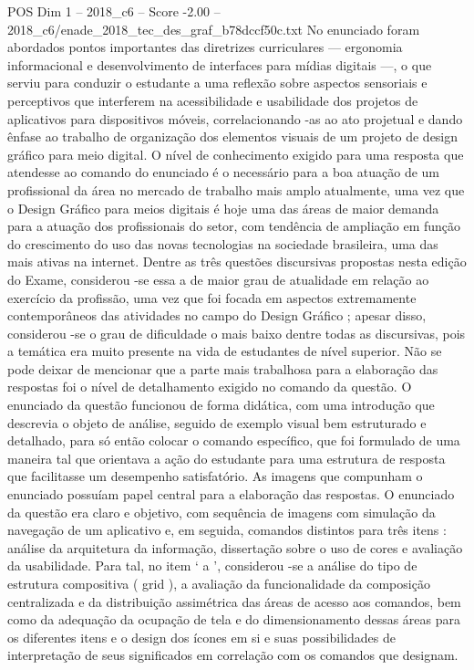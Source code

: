 \begin{textsample}{POS Dim 1 – 2018\_c6 – Score -2.00 – 2018\_c6/enade\_2018\_tec\_des\_graf\_b78dccf50c.txt}
No enunciado foram abordados pontos importantes das diretrizes curriculares — ergonomia informacional e desenvolvimento de interfaces para mídias digitais —, o que serviu para conduzir o estudante a uma reflexão sobre aspectos sensoriais e perceptivos que interferem na acessibilidade e usabilidade dos projetos de aplicativos para dispositivos móveis, correlacionando -as ao ato projetual e dando ênfase ao trabalho de organização dos elementos visuais de um projeto de design gráfico para meio digital.
O nível de conhecimento exigido para uma resposta que atendesse ao comando do enunciado é o necessário para a boa atuação de um profissional da área no mercado de trabalho mais amplo atualmente, uma vez que o Design Gráfico para meios digitais é hoje uma das áreas de maior demanda para a atuação dos profissionais do setor, com tendência de ampliação em função do crescimento do uso das novas tecnologias na sociedade brasileira, uma das mais ativas na internet.
Dentre as três questões discursivas propostas nesta edição do Exame, considerou -se essa a de maior grau de atualidade em relação ao exercício da profissão, uma vez que foi focada em aspectos extremamente contemporâneos das atividades no campo do Design Gráfico ; apesar disso, considerou -se o grau de dificuldade o mais baixo dentre todas as discursivas, pois a temática era muito presente na vida de estudantes de nível superior.
Não se pode deixar de mencionar que a parte mais trabalhosa para a elaboração das respostas foi o nível de detalhamento exigido no comando da questão.
O enunciado da questão funcionou de forma didática, com uma introdução que descrevia o objeto de análise, seguido de exemplo visual bem estruturado e detalhado, para só então colocar o comando específico, que foi formulado de uma maneira tal que orientava a ação do estudante para uma estrutura de resposta que facilitasse um desempenho satisfatório.
As imagens que compunham o enunciado possuíam papel central para a elaboração das respostas.
O enunciado da questão era claro e objetivo, com sequência de imagens com simulação da navegação de um aplicativo e, em seguida, comandos distintos para três itens : análise da arquitetura da informação, dissertação sobre o uso de cores e avaliação da usabilidade.
Para tal, no item ‘ a ’, considerou -se a análise do tipo de estrutura compositiva ( grid ), a avaliação da funcionalidade da composição centralizada e da distribuição assimétrica das áreas de acesso aos comandos, bem como da adequação da ocupação de tela e do dimensionamento dessas áreas para os diferentes itens e o design dos ícones em si e suas possibilidades de interpretação de seus significados em correlação com os comandos que designam.

\end{textsample}

